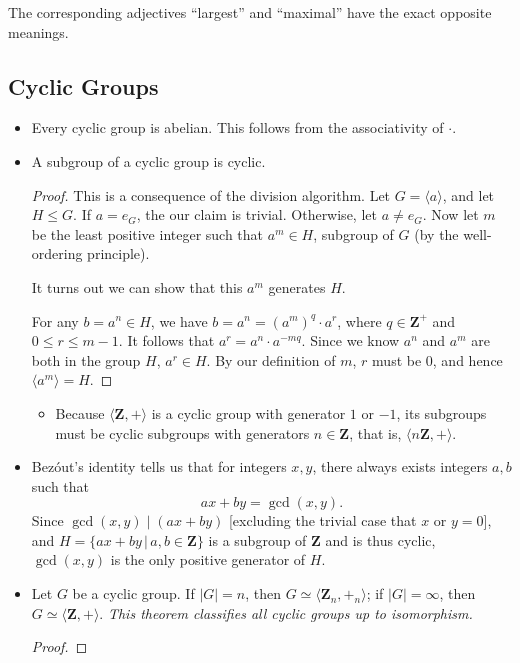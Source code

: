 \documentclass[11pt]{article}
\newcommand{\where}{\,|\,}
\newcommand{\Z}{\mathbf{Z}}
\newcommand{\la}{\langle}
\newcommand{\ra}{\rangle}
\newcommand{\abs}[1]{\lvert #1 \rvert}
\newcommand{\gen}[1]{\langle #1 \rangle}
\begin{document}
The corresponding adjectives ``largest'' and ``maximal'' have the exact opposite meanings.

\subsection{Cyclic Groups}
\begin{itemize}
    \item Every cyclic group is abelian. This follows from the associativity of $\cdot$.
    \item A subgroup of a cyclic group is cyclic.
    \begin{proof}
        This is a consequence of the division algorithm. Let $G = \gen{a}$, and let $H \leq G$. If $a = e_G$, the our claim is trivial. Otherwise, let $a \neq e_G$. Now let $m$ be the least positive integer such that $a^m \in H$, subgroup of $G$ (by the well-ordering principle).

        It turns out we can show that this $a^m$ generates $H$.
        
        For any $b = a^n \in H$, we have $b = a^n = (a^m)^q \cdot a^r$, where $q \in \Z^+$ and $0 \leq r \leq m-1$. It follows that $a^r = a^n \cdot a^{-mq}$. Since we know $a^n$ and $a^m$ are both in the group $H$, $a^r \in H$. By our definition of $m$, $r$ must be 0, and hence $\la a^m\ra = H$.
    \end{proof}
    \begin{itemize}
        \item Because $\la \Z,+ \ra$ is a cyclic group with generator $1$ or $-1$, its subgroups must be cyclic subgroups with generators $n \in \Z$, that is, $\la n\Z, + \ra$.
    \end{itemize}
    \item Bezóut's identity tells us that for integers $x,y$, there always exists integers $a,b$ such that \[ax+by = \gcd(x,y).\] Since $\gcd(x,y) \mid (ax+by)$ [excluding the trivial case that $x$ or $y = 0$], and $H = \{ax+by \where a,b \in \Z\}$ is a subgroup of $\Z$ and is thus cyclic, $\gcd(x,y)$ is the only positive generator of $H$.
    \item Let $G$ be a cyclic group. If $\abs{G} = n$, then $G \simeq \la \Z_n,+_n \ra$; if $\abs{G} = \infty$, then $G \simeq \la \Z,+ \ra$. \emph{This theorem classifies all cyclic groups up to isomorphism.}
    \begin{proof}
        
    \end{proof}
\end{itemize}
\end{document}

